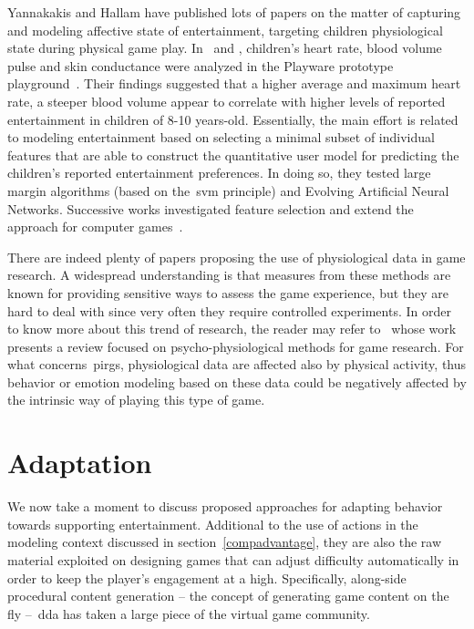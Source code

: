 Yannakakis and Hallam have published lots of papers on the matter of capturing and modeling affective state of entertainment, targeting children physiological state during physical game play. In~\cite{yannakakis_modeling_2006} and \cite{yannakakis_entertainment_2008}, children's heart rate, blood volume pulse and skin conductance were analyzed in the Playware prototype playground~\citep{lund_playware_2005}. Their findings suggested that a higher average and maximum heart rate, a steeper blood volume appear to correlate with higher levels of reported entertainment in children of 8-10 years-old. Essentially, the main effort is related to modeling entertainment based on selecting a minimal subset of individual features that are able to construct the quantitative user model for predicting the children's reported entertainment preferences. In doing so, they tested large margin algorithms (based on the~\gls{svm} principle) and Evolving Artificial Neural Networks. Successive works investigated feature selection and extend the approach for computer games~\citep{yannakakis_towards_2006,yannakakis_entertainment_2007,yannakakis_feature_2007,yannakakis_entertainment_2008-1}. 

There are indeed plenty of papers proposing the use of physiological data in game research. A widespread understanding is that measures from these methods are known for providing sensitive ways to assess the game experience, but they are hard to deal with since very often they require controlled experiments. In order to know more about this trend of research, the reader may refer to~\cite{kivikangas_review_2011} whose work presents a review focused on psycho-physiological methods for game research. For what concerns~\glspl{pirg}, physiological data are affected also by physical activity, thus behavior or emotion modeling based on these data could be negatively affected by the intrinsic way of playing this type of game.   

\section{Adaptation}\label{sec:about_dda}
We now take a moment to discuss proposed approaches for adapting behavior towards supporting entertainment. Additional to the use of actions in the modeling context discussed in section~\ref{compadvantage}, they are also the raw material exploited on designing games that can adjust difficulty automatically in order to keep the player's engagement at a high. Specifically, along-side procedural content generation -- the concept of generating game content on the fly --~\gls{dda} has taken a large piece of the virtual game community.

